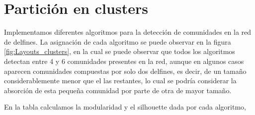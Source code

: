 \section{Partición en clusters}

\par Implementamos diferentes algoritmos para la detección de comunidades en la red de delfines. La asignación de cada algoritmo se puede observar en la figura \ref{fig:Layouts_clusters}, en la cual se puede observar que todos los algoritmos detectan entre 4 y 6 comunidades presentes en la red, aunque en algunos casos aparecen comunidades compuestas por solo dos delfines, es decir, de un tamaño considerablemente menor que el las restantes, lo cual se podría considerar la absorción de esta pequeña comunidad por parte de otra de mayor tamaño.
\par En la tabla  calculamos la modularidad y el silhouette dada por cada algoritmo, 

